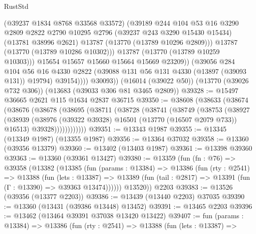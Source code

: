 \begin{lexlean}{RustStd}
\begin{coremodule}
                      (@39237 @1834 @8768 @33568 @33572)
                      (@39189
                        @244
                        @104
                        @53
                        @16
                        @3290
                        @2809
                        @2822
                        @2790
                        @10295
                        @2796
                        (@39237 @243 @3290 @15430 @15434)
                        (@13781 @38996 @2621)
                        @13787
                        (@13770 (@13789 @10296 @2809)))
                      @13787
                      (@13770 (@13789 @10286 @10302)))
                    @13787
                    (@13770 (@13789 @10259 @10303)))
                  @15654
                  @15657
                  @15660
                  @15664
                  @15669
                  @23209))
              (@39056
                @284
                @104
                @56
                @16
                @4330
                @2822
                (@39088 @131 @56 @131 @4330 (@13897 (@39093 @131)) @19794)
                @39154))))
        @30093))
    (@16014 (@39022 @50))
    (@13770 (@39026 @732 @306))
    (@13683 (@39033 @306 @81 @3465 @2809))
@39328 := @15497 @36665 @2621 @115 @1634 @2837 @36715
@39350 := @38608
    (@38633
      (@38674
        (@38676
          (@38678
            (@38695
              (@38711
                (@38728
                  (@38741
                    (@38749
                      (@38753
                        (@38927
                          (@38939
                            (@38976 (@39322 @39328) @16501 (@13770 (@16507 @2079 @733)) @16513)
                            @39328))))))))))))
@39351 := @13343 @1987
@39355 := @13345 (@13349 @1987) (@13355 @1987)
@39356 := @13364 @37032
@39358 := @13360 (@39356 @13379)
@39360 := @13402 (@13403 @1987)
@39361 := @13398 @39360
@39363 := @13360 (@39361 @13427)
@39380 := @13359
    (fun (fn : @76) =>
    @39358
      (@13382
        (@13385
          (fun (params : @13384) =>
          @13386
            (fun (rty : @2541) =>
            @13388
              (fun (lets : @13387) =>
              @13389 (fun (tail : @2817) => @13391 (fun (Γ : @13390) => @39363 @13474))))))
        @13520))
    @2203
@39383 := @13526 (@39356 (@13377 @2203))
@39386 := @13439 (@13440 @2203) @37035
@39390 := @13360 (@13431 (@39386 @13448) @13452)
@39391 := @13465 @2203
@39396 := @13462 (@13464 @39391 @37038 @13420 @13422)
@39407 := fun (params : @13384) =>
  @13386
    (fun (rty : @2541) =>
    @13388
      (fun (lets : @13387) =>

\end{coremodule}
\end{lexlean}
